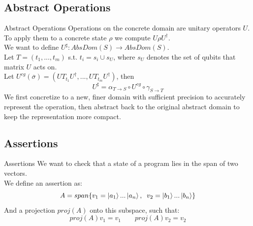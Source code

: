 \documentclass[11pt,svgnames,smaller,aspectratio=43,english]{beamer}
\begin{document}
\subsection{Abstract Operations}
\begin{frame}{Abstract Operations}
	Operations on the concrete domain are unitary operators $U$.\\
	To apply them to a concrete state $\rho$ we compute $U\rho U^\dagger$.\\
	We want to define $U^\sharp: \mathit{AbsDom}(S) \rightarrow \mathit{AbsDom}(S)$.\\
	\vspace*{1em}
	Let $T = (t_1, ..., t_m)$ s.t. $t_i = s_i \cup s_U$, where $s_U$ denotes the set of qubits that matrix $U$ acts on.\\

	Let $U^{cg}(\overline{\sigma}) = (UT_{t_1}U^\dagger, ..., UT_{t_m}U^\dagger)$, then
	\begin{equation*}
		U^\sharp = \alpha_{T \rightarrow S} \circ U^{cg} \circ \gamma_{S \rightarrow T}
	\end{equation*}
	We first concretize to a new, finer domain with sufficient precision to accurately represent the operation, then abstract back to the original abstract domain to keep the representation more compact.
\end{frame}

\subsection{Assertions}
\begin{frame}{Assertions}
	We want to check that a state of a program lies in the span of two vectors.\\
	We define an assertion as:
	\begin{equation*}
		A = span\{v_1 = \ket{a_1}...\ket{a_n},\;\; v_2 = \ket{b_1}...\ket{b_n}\}
	\end{equation*}
	And a projection $proj(A)$ onto this subspace, such that:
	\begin{equation*}
		proj(A)v_1 = v_1 \qquad proj(A)v_2 = v_2
	\end{equation*}
\end{frame}
\end{document}
